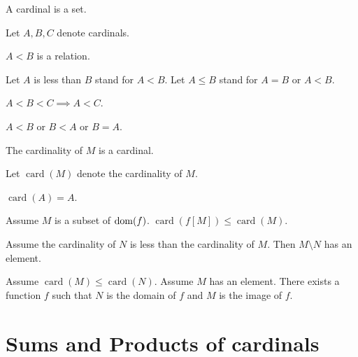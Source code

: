 \documentclass{article}
\newcommand{\card}[1]{\operatorname{card}(#1)}
\begin{document}
\begin{forthel}
  \begin{signature}
    A cardinal is a set.
  \end{signature}

  Let $A, B, C$ denote cardinals.

  \begin{signature}
    $A < B$ is a relation.
  \end{signature}

  Let $A$ is less than $B$ stand for $A < B$.
  Let $A \leq B$ stand for $A = B$ or $A < B$.

  \begin{axiom}
    $A < B < C \implies A < C$.
  \end{axiom}

  \begin{axiom}
    $A < B$ or $B < A$ or $B = A$.
  \end{axiom}

  \begin{signature}
    The cardinality of $M$ is a cardinal.
  \end{signature}

  Let $\card{M}$ denote the cardinality of $M$.

  \begin{axiom}
    $\card{A} = A$.
  \end{axiom}

  \begin{axiom}
    Assume $M$ is a subset of $\operatorname{dom}(f)$.
    $\card{f[M]} \leq \card{M}$.
  \end{axiom}

  \begin{axiom}
    Assume the cardinality of $N$ is less than the cardinality of $M$.
    Then $M \setminus N$ has an element.
  \end{axiom}

  \begin{axiom}
    Assume $\card{M} \leq \card{N}$.
    Assume $M$ has an element.
    There exists a function $f$ such that $N$ is the domain of $f$ and $M$ is
    the image of $f$.
  \end{axiom}
\end{forthel}


\section{Sums and Products of cardinals}
\end{document}
